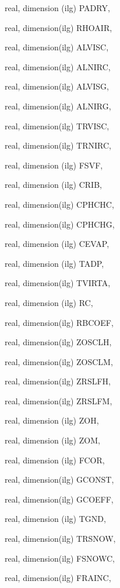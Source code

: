 {\begin{DoxyParamCaption}
\item[{real, dimension (ilg)}]{P\+A\+D\+R\+Y, }
\item[{real, dimension(ilg)}]{R\+H\+O\+A\+I\+R, }
\item[{real, dimension(ilg)}]{A\+L\+V\+I\+S\+C, }
\item[{real, dimension(ilg)}]{A\+L\+N\+I\+R\+C, }
\item[{real, dimension(ilg)}]{A\+L\+V\+I\+S\+G, }
\item[{real, dimension(ilg)}]{A\+L\+N\+I\+R\+G, }
\item[{real, dimension(ilg)}]{T\+R\+V\+I\+S\+C, }
\item[{real, dimension(ilg)}]{T\+R\+N\+I\+R\+C, }
\item[{real, dimension  (ilg)}]{F\+S\+V\+F, }
\item[{real, dimension  (ilg)}]{C\+R\+I\+B, }
\item[{real, dimension(ilg)}]{C\+P\+H\+C\+H\+C, }
\item[{real, dimension(ilg)}]{C\+P\+H\+C\+H\+G, }
\item[{real, dimension (ilg)}]{C\+E\+V\+A\+P, }
\item[{real, dimension  (ilg)}]{T\+A\+D\+P, }
\item[{real, dimension(ilg)}]{T\+V\+I\+R\+T\+A, }
\item[{real, dimension    (ilg)}]{R\+C, }
\item[{real, dimension(ilg)}]{R\+B\+C\+O\+E\+F, }
\item[{real, dimension(ilg)}]{Z\+O\+S\+C\+L\+H, }
\item[{real, dimension(ilg)}]{Z\+O\+S\+C\+L\+M, }
\item[{real, dimension(ilg)}]{Z\+R\+S\+L\+F\+H, }
\item[{real, dimension(ilg)}]{Z\+R\+S\+L\+F\+M, }
\item[{real, dimension   (ilg)}]{Z\+O\+H, }
\item[{real, dimension   (ilg)}]{Z\+O\+M, }
\item[{real, dimension  (ilg)}]{F\+C\+O\+R, }
\item[{real, dimension(ilg)}]{G\+C\+O\+N\+S\+T, }
\item[{real, dimension(ilg)}]{G\+C\+O\+E\+F\+F, }
\item[{real, dimension  (ilg)}]{T\+G\+N\+D, }
\item[{real, dimension(ilg)}]{T\+R\+S\+N\+O\+W, }
\item[{real, dimension(ilg)}]{F\+S\+N\+O\+W\+C, }
\item[{real, dimension(ilg)}]{F\+R\+A\+I\+N\+C, }

\end{DoxyParamCaption}}
